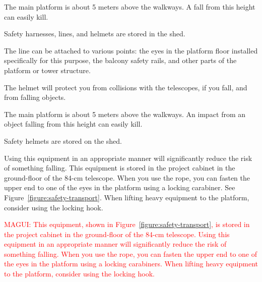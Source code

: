 
The main platform is about 5 meters above the walkways. A fall from this height can easily kill.

Safety harnesses, lines, and helmets are stored in the shed.

The line can be attached to various points: the eyes in the platform floor installed specifically for this purpose, the balcony safety rails, and other parts of the platform or tower structure.

The helmet will protect you from collisions with the telescopes, if you fall, and from falling objects.


The main platform is about 5 meters above the walkways. An impact from an object falling from this height can easily kill.

Safety helmets are stored on the shed.


Using this equipment in an appropriate manner will significantly reduce the risk of something falling. This equipment is stored in the project cabinet in the ground-floor of the 84-cm telescope. When you use the rope, you can fasten the upper end to one of the eyes in the platform using a locking carabiner. See Figure~\ref{figure:safety-transport}. When lifting heavy equipment to the platform, consider using the locking hook. 

\textcolor{red}{MAGUI: This equipment, shown in Figure~\ref{figure:safety-transport}, is stored in the project cabinet in the ground-floor of the 84-cm telescope. Using this equipment in an appropriate manner will significantly reduce the risk of something falling. When you use the rope, you can fasten the upper end to one of the eyes in the platform using a locking carabiners. When lifting heavy equipment to the platform, consider using the locking hook.}

